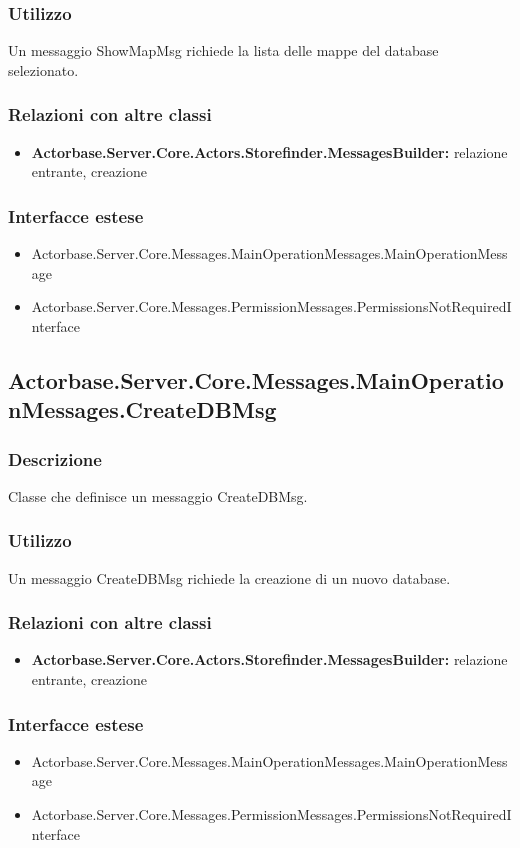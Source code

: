 \documentclass[a4paper]{article}
\begin{document}
			\subsubsection{Utilizzo}
				Un messaggio ShowMapMsg richiede la lista delle mappe del database selezionato.
			\subsubsection{Relazioni con altre classi}
			\begin{itemize}
				\item \textbf{Actorbase.Server.Core.Actors.Storefinder.MessagesBuilder:} relazione entrante, creazione
			\end{itemize}
			\subsubsection{Interfacce estese}
			\begin{itemize}
				\item Actorbase.Server.Core.Messages.MainOperationMessages.MainOperationMessage
				\item Actorbase.Server.Core.Messages.PermissionMessages.PermissionsNotRequiredInterface
			\end{itemize}

			\subsection{Actorbase.Server.Core.Messages.MainOperationMessages.CreateDBMsg}
			\subsubsection{Descrizione}
				Classe che definisce un messaggio CreateDBMsg.
			\subsubsection{Utilizzo}
				Un messaggio CreateDBMsg richiede la creazione di un nuovo database.
			\subsubsection{Relazioni con altre classi}
			\begin{itemize}
				\item \textbf{Actorbase.Server.Core.Actors.Storefinder.MessagesBuilder:} relazione entrante, creazione
			\end{itemize}
			\subsubsection{Interfacce estese}
			\begin{itemize}
				\item Actorbase.Server.Core.Messages.MainOperationMessages.MainOperationMessage
				\item Actorbase.Server.Core.Messages.PermissionMessages.PermissionsNotRequiredInterface
			\end{itemize}
\end{document}
